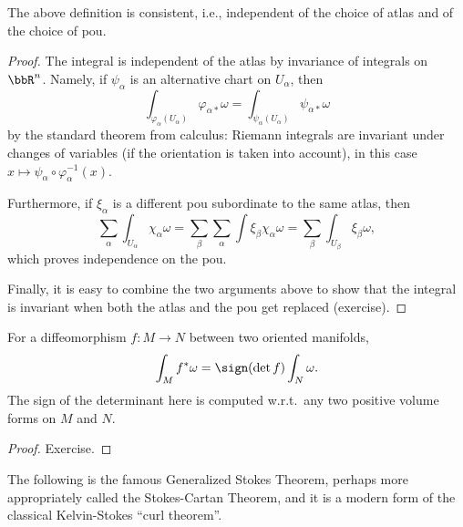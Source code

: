 \begin{prop}
    The above definition is consistent, i.e., independent of the choice of atlas and of the choice of \gls{pou}.
\end{prop}
\begin{proof}
    The integral is independent of the atlas by invariance of integrals on $\bbR^n$. Namely, if $\psi_\alpha$ is an alternative chart on $U_\alpha$, then
    \[\int_{\varphi_\alpha(U_\alpha)}\varphi_{\alpha\ast}\omega=\int_{\psi_\alpha(U_\alpha)}\psi_{\alpha\ast}\omega\]
    by the standard theorem from calculus: Riemann integrals are invariant under changes of variables (if the orientation is taken into account), in this case $x\mapsto \psi_\alpha\circ\varphi_\alpha^{-1}(x)$.

    Furthermore, if $\xi_\alpha$ is a different \gls{pou} subordinate to the same atlas, then
    \[\sum_\alpha\int_{U_\alpha}\chi_\alpha\omega=\sum_\beta\sum_\alpha\int \xi_\beta\chi_\alpha\omega=\sum_\beta\int_{U_\beta}\xi_\beta\omega,\]
    which proves independence on the \gls{pou}.

    Finally, it is easy to combine the two arguments above to show that the integral is invariant when both the atlas and the \gls{pou} get replaced (exercise).
\end{proof}


\begin{prop}
    For a diffeomorphism $f:M\to N$ between two oriented manifolds,
    \[\int_M f^\ast \omega=\sign(\det f) \int_N \omega.\]
    The sign of the determinant here is computed w.r.t.\ any two positive volume forms on $M$ and $N$.
\end{prop}
\begin{proof}
Exercise.
\end{proof}

The following is the famous Generalized Stokes Theorem, perhaps more appropriately called the Stokes-Cartan Theorem, and it is a modern form of the classical Kelvin-Stokes ``curl theorem''.


